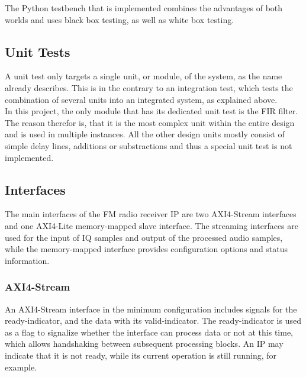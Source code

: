 The Python testbench that is implemented combines the advantages of both worlds and uses black box testing, as well as white box testing.

\subsection{Unit Tests}

A unit test only targets a single unit, or module, of the system, as the name already describes.
This is in the contrary to an integration test, which tests the combination of several units into an integrated system, as explained above.\\

In this project, the only module that has its dedicated unit test is the FIR filter.
The reason therefor is, that it is the most complex unit within the entire design and is used in multiple instances.
All the other design units mostly consist of simple delay lines, additions or substractions and thus a special unit test is not implemented.

\subsection{Interfaces}

The main interfaces of the FM radio receiver IP are two AXI4-Stream interfaces and one AXI4-Lite memory-mapped slave interface.
The streaming interfaces are used for the input of IQ samples and output of the processed audio samples, while the memory-mapped interface provides configuration options and status information.

\subsubsection{AXI4-Stream}

An AXI4-Stream interface in the minimum configuration includes signals for the ready-indicator, and the data with its valid-indicator.
The ready-indicator is used as a flag to signalize whether the interface can process data or not at this time, which allows handshaking between subsequent processing blocks.
An IP may indicate that it is not ready, while its current operation is still running, for example.\\

